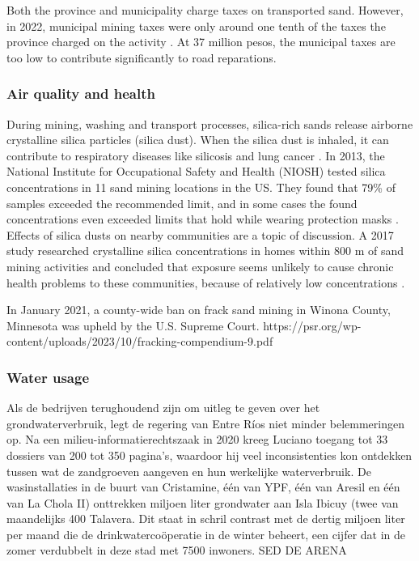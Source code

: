 Both the province and municipality charge taxes on transported sand. However, in 2022, municipal mining taxes were only around one tenth of the taxes the province charged on the activity \autocite{novasImpactoAmbientalOculto2022}. At 37 million pesos, the municipal taxes are too low to contribute significantly to road reparations.

\subsubsection{Air quality and health}
During mining, washing and transport processes, silica-rich sands release airborne crystalline silica particles (silica dust). When the silica dust is inhaled, it can contribute to respiratory diseases like silicosis and lung cancer \autocite{physiciansforsocialresponsibilityCompendiumScientificMedical2023}. In 2013, the National Institute for Occupational Safety and Health (NIOSH) tested silica concentrations in 11 sand mining locations in the US. They found that 79\% of samples exceeded the recommended limit, and in some cases the found concentrations even exceeded limits that hold while wearing protection masks \autocite{fogliaSedArena2023}. Effects of silica dusts on nearby communities are a topic of discussion. A 2017 study researched crystalline silica concentrations in homes within 800 m of sand mining activities and concluded that exposure seems unlikely to cause chronic health problems to these communities, because of relatively low concentrations \autocite{comm}.

 In January 2021, a
county-wide ban on frack sand mining in Winona County, Minnesota was upheld by the U.S.
Supreme Court.
https://psr.org/wp-content/uploads/2023/10/fracking-compendium-9.pdf


\subsubsection{Water usage}
Als de bedrijven terughoudend zijn om uitleg te geven over het grondwaterverbruik, legt de regering van Entre Ríos niet minder belemmeringen op. Na een milieu-informatierechtszaak in 2020 kreeg Luciano toegang tot 33 dossiers van 200 tot 350 pagina's, waardoor hij veel inconsistenties kon ontdekken tussen wat de zandgroeven aangeven en hun werkelijke waterverbruik. De wasinstallaties in de buurt van Cristamine, één van YPF, één van Aresil en één van La Chola II) onttrekken miljoen liter grondwater aan Isla Ibicuy (twee van maandelijks 400 Talavera. Dit staat in schril contrast met de dertig miljoen liter per maand die de drinkwatercoöperatie in de winter beheert, een cijfer dat in de zomer verdubbelt in deze stad met 7500 inwoners. SED DE ARENA

